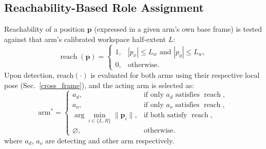 \documentclass[letterpaper, 10 pt, conference]{ieeeconf}  %
\begin{document}
\subsection{Reachability-Based Role Assignment}
\label{reachability}
Reachability of a position $\mathbf p$ (expressed in a given arm's own base frame) is tested against that arm's calibrated workspace half-extent $L$:
\begin{equation}
\operatorname{reach}(\mathbf{p})
=
\begin{cases}
1, & |p_x| \leq L_w \text{ and } |p_y| \leq L_w,\\
0, & \text{otherwise}.
\end{cases}
\label{reach_eq}
\end{equation}
Upon detection, $\text{reach}(\cdot)$ is evaluated for both arms using their respective local pose (Sec.~\ref{cross_frame}), and the acting arm is selected as:
\begin{equation}
\mathrm{arm}^{*}=
\begin{cases}
a_d, &
\text{if only } a_d \text{ satisfies } \operatorname{reach},\\[0.5ex]
a_o, &
\text{if only } a_o \text{ satisfies } \operatorname{reach},\\[0.5ex]
\displaystyle
\arg\min_{i\in\{L,R\}}
\|\mathbf{p}_i\|, &
\text{if both satisfy } \operatorname{reach},\\[1ex]
\varnothing, &
\text{otherwise}.
\end{cases}
\end{equation}
where $a_{d}$, $a_{o}$ are detecting and other arm respectively.
\end{document}
